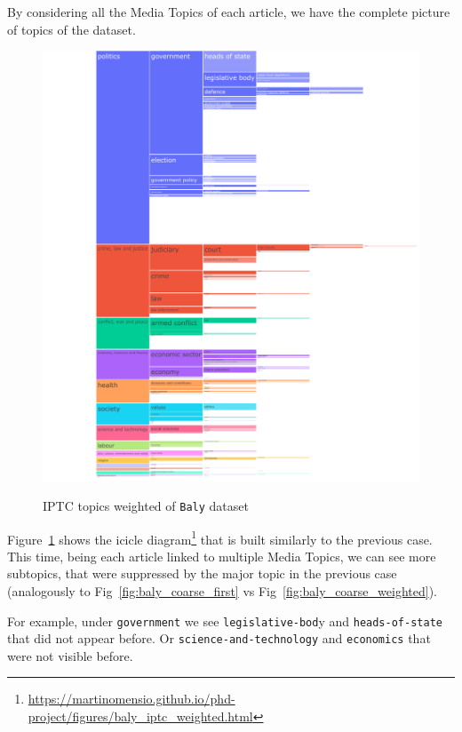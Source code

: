 By considering all the Media Topics of each article, we have the complete picture of topics of the dataset. 

\begin{figure}[!htbp]
    \centering
    \href{https://martinomensio.github.io/phd-project/figures/baly_iptc_weighted.html}{\includegraphics[trim={2.65cm 0cm 0cm 0cm},clip,width=\linewidth]{figures/baly_iptc_weighted.pdf}}
    \caption{IPTC topics weighted of \texttt{Baly} dataset}
    \label{fig:baly_iptc_weighted}
\end{figure}

Figure~\ref{fig:baly_iptc_weighted}
shows the icicle diagram\footnote{\url{https://martinomensio.github.io/phd-project/figures/baly_iptc_weighted.html}} that is built similarly to the previous case. This time, being each article linked to multiple Media Topics, we can see more subtopics, that were suppressed by the major topic in the previous case (analogously to Fig~\ref{fig:baly_coarse_first} vs Fig~\ref{fig:baly_coarse_weighted}).

For example, under \texttt{government} we see \texttt{legislative-bod}y and \texttt{heads-of-state} that did not appear before. Or \texttt{science-and-technology} and \texttt{economics} that were not visible before.


